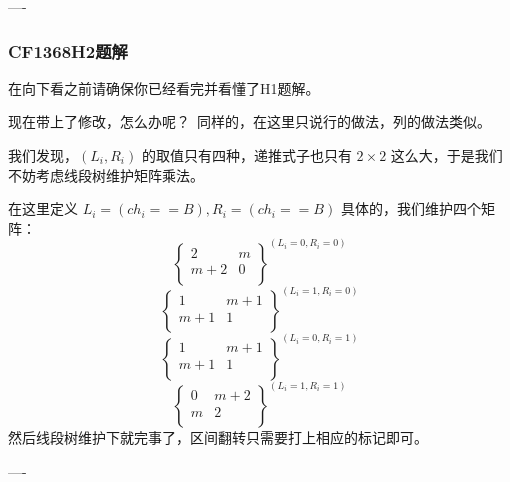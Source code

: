 \documentclass[a4paper,12pt]{article}
\begin{document}
----

\subsubsection*{CF1368H2题解}

在向下看之前请确保你已经看完并看懂了H1题解。

现在带上了修改，怎么办呢？\
同样的，在这里只说行的做法，列的做法类似。

我们发现，$(L_i,R_i)$ 的取值只有四种，递推式子也只有 $2\times2$ 这么大，于是我们不妨考虑线段树维护矩阵乘法。

在这里定义 $L_i=(ch_i==B),R_i=(ch_i==B)$
具体的，我们维护四个矩阵：
$$
\begin{Bmatrix}
2&m\\
m+2&0\\
\end{Bmatrix}^{(L_i=0,R_i=0)}
$$
$$
\begin{Bmatrix}
1&m+1\\
m+1&1\\
\end{Bmatrix}^{(L_i=1,R_i=0)}
$$
$$
\begin{Bmatrix}
1&m+1\\
m+1&1\\
\end{Bmatrix}^{(L_i=0,R_i=1)}
$$
$$
\begin{Bmatrix}
0&m+2\\
m&2\\
\end{Bmatrix}^{(L_i=1,R_i=1)}
$$
然后线段树维护下就完事了，区间翻转只需要打上相应的标记即可。

----
\end{document}
